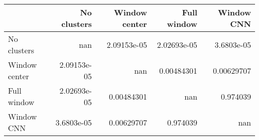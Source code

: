 \begin{tabular}{lrrrr}
\toprule
               &   No clusters &   Window center &   Full window &   Window CNN \\
\midrule
 No clusters   & nan           &     2.09153e-05 &   2.02693e-05 &   3.6803e-05 \\
 Window center &   2.09153e-05 &   nan           &   0.00484301  &   0.00629707 \\
 Full window   &   2.02693e-05 &     0.00484301  & nan           &   0.974039   \\
 Window CNN    &   3.6803e-05  &     0.00629707  &   0.974039    & nan          \\
\bottomrule
\end{tabular}